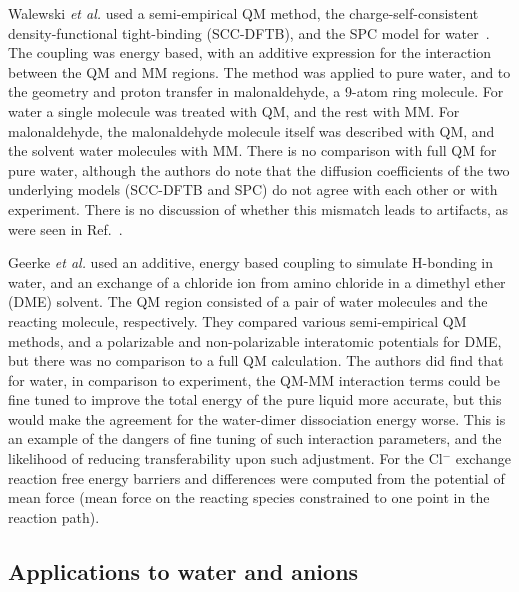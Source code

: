 \documentclass[11pt]{revtex4}
\begin{document}
Walewski {\it et al.} used a semi-empirical QM method, the
charge-self-consistent density-functional tight-binding (SCC-DFTB),
and the SPC model for water~\cite{walewski_chem_phys_lett_2004a}.
The coupling was energy based, with an additive expression for the
interaction between the QM and MM regions.  The method was applied
to pure water, and to the geometry and proton transfer in malonaldehyde,
a 9-atom ring molecule.  For water a single molecule was treated
with QM, and the rest with MM.  For malonaldehyde, the malonaldehyde
molecule itself was described with QM, and the solvent water molecules
with MM.  There is no comparison with full QM for pure water,
although the authors do note that the diffusion coefficients of the
two underlying models (SCC-DFTB and SPC) do not agree with each
other or with experiment.  There is no discussion of whether this
mismatch leads to artifacts, as were seen in
Ref.~.

Geerke {\it et al.} used an additive, energy based coupling to
simulate H-bonding in water, and an exchange of a chloride ion from
amino chloride in a dimethyl ether (DME) solvent.  The QM region
consisted of a pair of water molecules and the reacting molecule,
respectively.  They compared various semi-empirical QM methods, and
a polarizable and non-polarizable interatomic potentials for DME,
but there was no comparison to a full QM calculation.  The authors
did find that for water, in comparison to experiment, the QM-MM
interaction terms could be fine tuned to improve the total energy
of the pure liquid more accurate, but this would make the agreement
for the water-dimer dissociation energy worse.  This is an example
of the dangers of fine tuning of such interaction parameters, and
the likelihood of reducing transferability upon such adjustment.
For the Cl$^-$ exchange reaction free energy barriers and differences
were computed from the potential of mean force (mean force on the
reacting species constrained to one point in the reaction path).

\subsection{Applications to water and anions}
\end{document}
